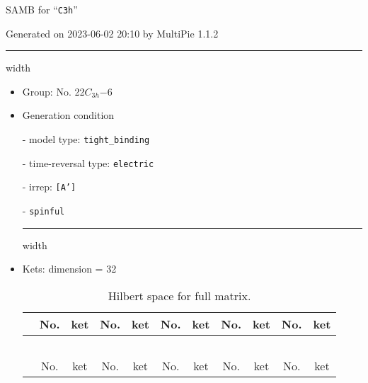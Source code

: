 \documentclass[fleqn,10pt,landscape]{article}
\begin{document}
\setcounter{MaxMatrixCols}{16}

\setlength{\baselineskip}{16pt}
\footnotesize
\begin{center}
\LARGE
SAMB for ``\texttt{C3h}''
\end{center}
\begin{flushright}
Generated on 2023-06-02 20:10 by MultiPie 1.1.2
\end{flushright}
\vspace{1cm}


 \hfil \hrule height 1mm width \textwidth \hfil

\begin{itemize}
\item Group: No. 22\quad$C_{3h}$\quad$-6$\quad[ hexagonal ]

\vspace{5mm}

\item Generation condition

\quad - model type: \texttt{tight_binding}

\quad - time-reversal type: \texttt{electric}

\quad - irrep: \texttt{[A']}

\quad - \texttt{spinful}


 \hfil \hrule height 1mm width \textwidth \hfil

\item Kets: dimension = 32
\begin{center}
\renewcommand{\arraystretch}{1.3}
\begin{longtable}{c|cc|cc|cc|cc|cc}
\caption{Hilbert space for full matrix.}
 \\
 \hline \hline
 & No. & ket & No. & ket & No. & ket & No. & ket & No. & ket \\ \hline \endfirsthead

\multicolumn{10}{l}{\tablename\ \thetable{}} \\
 \hline \hline
 & No. & ket & No. & ket & No. & ket & No. & ket & No. & ket \\ \hline \endhead


\end{longtable}
\end{center}
\end{itemize}
\end{document}
